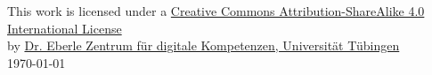 

\begin{center}
  This work is licensed under a
  \href{http://creativecommons.org/licenses/by-sa/4.0/}{Creative Commons Attribution-ShareAlike 4.0 International License}
  \\
  by
  \href{https://uni-tuebingen.de/de/151602}{Dr. Eberle Zentrum für digitale Kompetenzen, Universität Tübingen}
  \\
  \vspace{0.5em}
  \today{}
\end{center}
